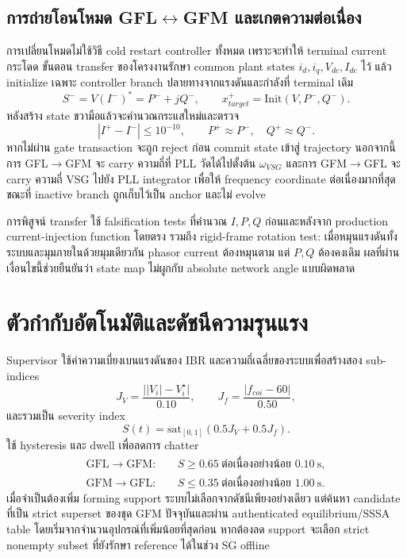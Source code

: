 \documentclass[12pt,a4paper]{article}
\begin{document}
\subsection{การถ่ายโอนโหมด GFL$\leftrightarrow$GFM และเกตความต่อเนื่อง}
การเปลี่ยนโหมดไม่ใช้วิธี cold restart controller ทั้งหมด เพราะจะทำให้ terminal current กระโดด ขั้นตอน transfer ของโครงงานรักษา common plant states $i_d,i_q,V_{dc},I_{dc}$ ไว้ แล้ว initialize เฉพาะ controller branch ปลายทางจากแรงดันและกำลังที่ terminal เดิม
\begin{equation}
S^- =V\left(I^-\right)^*=P^-+jQ^-,\qquad
x_{target}^{+}=\mathrm{Init}(V,P^-,Q^-).
\end{equation}
หลังสร้าง state ขวามือแล้วจะคำนวณกระแสใหม่และตรวจ
\begin{equation}
|I^{+}-I^{-}|\le 10^{-10},\qquad
P^{+}\approx P^{-},\quad Q^{+}\approx Q^{-}.
\label{eq:transfergate}
\end{equation}
หากไม่ผ่าน gate transaction จะถูก reject ก่อน commit state เข้าสู่ trajectory นอกจากนี้การ GFL$\to$GFM จะ carry ความถี่ที่ PLL วัดได้ไปตั้งต้น $\omega_{VSG}$ และการ GFM$\to$GFL จะ carry ความถี่ VSG ไปยัง PLL integrator เพื่อให้ frequency coordinate ต่อเนื่องมากที่สุด ขณะที่ inactive branch ถูกเก็บไว้เป็น anchor และไม่ evolve

การพิสูจน์ transfer ใช้ falsification tests ที่คำนวณ $I,P,Q$ ก่อนและหลังจาก production current-injection function โดยตรง รวมถึง rigid-frame rotation test: เมื่อหมุนแรงดันทั้งระบบและมุมภายในด้วยมุมเดียวกัน phasor current ต้องหมุนตาม แต่ $P,Q$ ต้องคงเดิม ผลที่ผ่านเงื่อนไขนี้ช่วยยืนยันว่า state map ไม่ผูกกับ absolute network angle แบบผิดพลาด

\section{ตัวกำกับอัตโนมัติและดัชนีความรุนแรง}
Supervisor ใช้ค่าความเบี่ยงเบนแรงดันของ IBR และความถี่เฉลี่ยของระบบเพื่อสร้างสอง sub-indices
\begin{equation}
J_V=\frac{\big||V_i|-V_i^{\star}\big|}{0.10},\qquad
J_f=\frac{|f_{coi}-60|}{0.50},
\end{equation}
และรวมเป็น severity index
\begin{equation}
S(t)=\mathrm{sat}_{[0,1]}\left(0.5J_V+0.5J_f\right).
\label{eq:severity_summary}
\end{equation}
ใช้ hysteresis และ dwell เพื่อลดการ chatter
\begin{align}
\mathrm{GFL}\to\mathrm{GFM}:&\quad S\ge0.65\ \text{ต่อเนื่องอย่างน้อย }0.10\ \mathrm{s},\\
\mathrm{GFM}\to\mathrm{GFL}:&\quad S\le0.35\ \text{ต่อเนื่องอย่างน้อย }1.00\ \mathrm{s}.
\label{eq:hysteresis_summary}
\end{align}
เมื่อจำเป็นต้องเพิ่ม forming support ระบบไม่เลือกจากดัชนีเพียงอย่างเดียว แต่ค้นหา candidate ที่เป็น strict superset ของชุด GFM ปัจจุบันและผ่าน authenticated equilibrium/SSSA table โดยเริ่มจากจำนวนอุปกรณ์ที่เพิ่มน้อยที่สุดก่อน หากต้องลด support จะเลือก strict nonempty subset ที่ยังรักษา reference ได้ในช่วง SG offline
\end{document}
